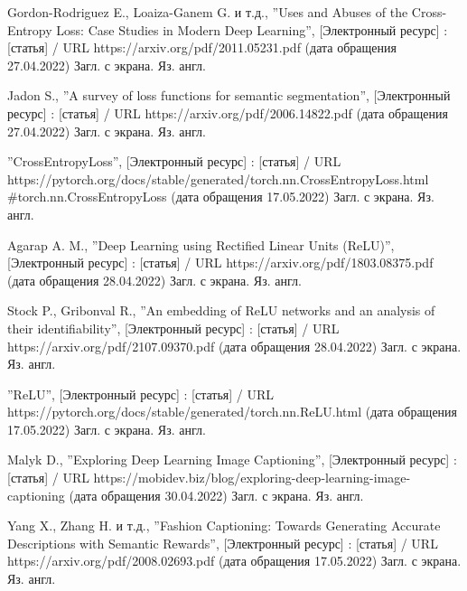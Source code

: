 \documentclass[bachelor, och, coursework]{SCWorks}
\begin{document}
\begin{thebibliography}{99}

     Gordon-Rodriguez E., Loaiza-Ganem G. и т.д., ''Uses and
    Abuses of the Cross-Entropy Loss: Case Studies in Modern Deep Learning'',
    [Электронный ресурс] : [статья] / URL https://arxiv.org/pdf/2011.05231.pdf
    (дата обращения 27.04.2022) Загл. с экрана. Яз. англ.

     Jadon S., ''A survey of loss functions for semantic
    segmentation'', [Электронный ресурс] : [статья] / URL
    https://arxiv.org/pdf/2006.14822.pdf (дата обращения 27.04.2022) Загл. с
    экрана. Яз. англ.

     ''CrossEntropyLoss'', [Электронный ресурс] : [статья] /
    URL https://pytorch.org/docs/stable/generated/torch.nn.CrossEntropyLoss.html
    \\ \#torch.nn.CrossEntropyLoss (дата обращения 17.05.2022) Загл. с экрана.
    Яз. англ.


     Agarap A. M., ''Deep Learning using Rectified Linear Units
    (ReLU)'', [Электронный ресурс] : [статья] / URL
    https://arxiv.org/pdf/1803.08375.pdf (дата обращения 28.04.2022) Загл. с
    экрана. Яз. англ.

     Stock P., Gribonval R., ''An embedding of ReLU networks and
    an analysis of their identifiability'', [Электронный ресурс] : [статья] /
    URL https://arxiv.org/pdf/2107.09370.pdf (дата обращения 28.04.2022) Загл. с
    экрана. Яз. англ.
    
     ''ReLU'', [Электронный ресурс] : [статья] / URL
    https://pytorch.org/docs/stable/generated/torch.nn.ReLU.html (дата обращения
    17.05.2022) Загл. с экрана. Яз. англ.

     Malyk D., ''Exploring Deep Learning Image
    Captioning'', [Электронный ресурс] : [статья] / URL
    https://mobidev.biz/blog/exploring-deep-learning-image-captioning (дата
    обращения 30.04.2022) Загл. с экрана. Яз. англ.

     Yang X., Zhang H. и т.д., ''Fashion Captioning: Towards
    Generating Accurate Descriptions with Semantic Rewards'', [Электронный
    ресурс] : [статья] / URL https://arxiv.org/pdf/2008.02693.pdf (дата
    обращения 17.05.2022) Загл. с экрана. Яз. англ.


\end{thebibliography}
\end{document}
